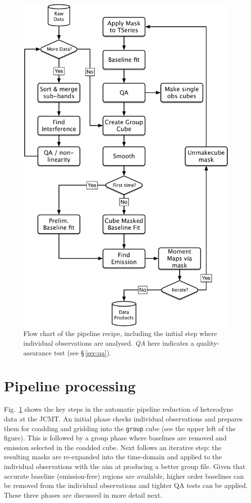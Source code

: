 \documentclass[useAMS,usenatbib]{mn2e}
\begin{document}
\begin{figure}
\includegraphics[width=\columnwidth]{flowchart}
\caption{Flow chart of the pipeline recipe, including the initial step
  where individual observations are analysed. \emph{QA} here indicates
  a quality-assurance test (see \S\,\ref{sec:qa}).
}
\label{fig:flowchart}
\end{figure}

\section{Pipeline processing}

Fig.~\ref{fig:flowchart} shows the key steps in the automatic
pipeline reduction of heterodyne data at the JCMT. An initial phase
checks individual observations and prepares them for coadding and
gridding into the \texttt{group} cube (see the upper left of the figure).
This is followed by a group
phase where baselines are removed and emission selected in the coadded
cube.  Next follows an iterative step: the resulting masks are
re-expanded into the time-domain and applied to the individual
observations with the aim at producing a better group file. Given that
accurate baseline (emission-free) regions are available, higher
order baselines can be removed from the individual observations and
tighter QA tests can be applied. These three phases are discussed in
more detail next.
\end{document}
